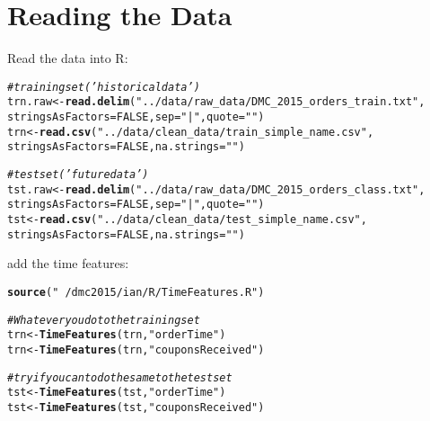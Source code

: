 \documentclass[10pt]{report}
\makeatletter
\newcommand{\hlnum}[1]{\textcolor[rgb]{0.686,0.059,0.569}{#1}}%
\newcommand{\hlstr}[1]{\textcolor[rgb]{0.192,0.494,0.8}{#1}}%
\newcommand{\hlcom}[1]{\textcolor[rgb]{0.678,0.584,0.686}{\textit{#1}}}%
\newcommand{\hlstd}[1]{\textcolor[rgb]{0.345,0.345,0.345}{#1}}%
\newcommand{\hlkwb}[1]{\textcolor[rgb]{0.69,0.353,0.396}{#1}}%
\newcommand{\hlkwc}[1]{\textcolor[rgb]{0.333,0.667,0.333}{#1}}%
\newcommand{\hlkwd}[1]{\textcolor[rgb]{0.737,0.353,0.396}{\textbf{#1}}}%
\newenvironment{kframe}{%
 \def\at@end@of@kframe{}%
 \ifinner\ifhmode%
  \def\at@end@of@kframe{\end{minipage}}%
  \begin{minipage}{\columnwidth}%
 \fi\fi%
 \def\FrameCommand##1{\hskip\@totalleftmargin \hskip-\fboxsep
 \colorbox{shadecolor}{##1}\hskip-\fboxsep
     \hskip-\linewidth \hskip-\@totalleftmargin \hskip\columnwidth}%
 \MakeFramed {\advance\hsize-\width
   \@totalleftmargin\z@ \linewidth\hsize
   \@setminipage}}%
 {\par\unskip\endMakeFramed%
 \at@end@of@kframe}
\newenvironment{knitrout}{}{} %
\makeatother
\begin{document}
\section{Reading the Data}
Read the data into R:
\begin{knitrout}
\color{fgcolor}\begin{kframe}
\begin{alltt}
\hlcom{# training set ('historical data')}
\hlstd{trn.raw} \hlkwb{<-} \hlkwd{read.delim}\hlstd{(}\hlstr{"../data/raw_data/DMC_2015_orders_train.txt"}\hlstd{,}
    \hlkwc{stringsAsFactors} \hlstd{=} \hlnum{FALSE}\hlstd{,} \hlkwc{sep} \hlstd{=} \hlstr{"|"}\hlstd{,} \hlkwc{quote} \hlstd{=} \hlstr{""}\hlstd{)}
\hlstd{trn} \hlkwb{<-} \hlkwd{read.csv}\hlstd{(}\hlstr{"../data/clean_data/train_simple_name.csv"}\hlstd{,}
    \hlkwc{stringsAsFactors} \hlstd{=} \hlnum{FALSE}\hlstd{,} \hlkwc{na.strings} \hlstd{=} \hlstr{""}\hlstd{)}

\hlcom{# test set ('future data')}
\hlstd{tst.raw} \hlkwb{<-} \hlkwd{read.delim}\hlstd{(}\hlstr{"../data/raw_data/DMC_2015_orders_class.txt"}\hlstd{,}
    \hlkwc{stringsAsFactors} \hlstd{=} \hlnum{FALSE}\hlstd{,} \hlkwc{sep} \hlstd{=} \hlstr{"|"}\hlstd{,} \hlkwc{quote} \hlstd{=} \hlstr{""}\hlstd{)}
\hlstd{tst} \hlkwb{<-} \hlkwd{read.csv}\hlstd{(}\hlstr{"../data/clean_data/test_simple_name.csv"}\hlstd{,}
    \hlkwc{stringsAsFactors} \hlstd{=} \hlnum{FALSE}\hlstd{,} \hlkwc{na.strings} \hlstd{=} \hlstr{""}\hlstd{)}
\end{alltt}
\end{kframe}
\end{knitrout}
add the time features:
\begin{knitrout}
\color{fgcolor}\begin{kframe}
\begin{alltt}
\hlkwd{source}\hlstd{(}\hlstr{"~/dmc2015/ian/R/TimeFeatures.R"}\hlstd{)}

\hlcom{# Whatever you do to the training set}
\hlstd{trn} \hlkwb{<-} \hlkwd{TimeFeatures}\hlstd{(trn,} \hlstr{"orderTime"}\hlstd{)}
\hlstd{trn} \hlkwb{<-} \hlkwd{TimeFeatures}\hlstd{(trn,} \hlstr{"couponsReceived"}\hlstd{)}

\hlcom{# try if you can to do the same to the test set}
\hlstd{tst} \hlkwb{<-} \hlkwd{TimeFeatures}\hlstd{(tst,} \hlstr{"orderTime"}\hlstd{)}
\hlstd{tst} \hlkwb{<-} \hlkwd{TimeFeatures}\hlstd{(tst,} \hlstr{"couponsReceived"}\hlstd{)}
\end{alltt}
\end{kframe}
\end{knitrout}
\end{document}
